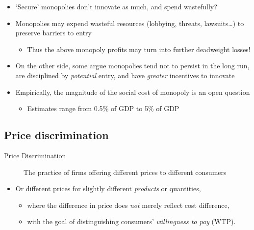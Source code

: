 \documentclass[]{article}
\providecommand{\tightlist}{%
  \setlength{\itemsep}{0pt}\setlength{\parskip}{0pt}}
\begin{document}
\begin{itemize}
\item
  `Secure' monopolies don't innovate as much, and spend wastefully?
\item
  Monopolies may expend wasteful resources (lobbying, threats,
  lawsuits\ldots) to preserve barriers to entry

  \begin{itemize}
  \tightlist
  \item
    Thus the above monopoly profits may turn into further deadweight
    losses!
  \end{itemize}
\item
  On the other side, some argue monopolies tend not to persist in the
  long run, are disciplined by \emph{potential} entry, and have
  \emph{greater} incentives to innovate
\item
  Empirically, the magnitude of the social cost of monopoly is an open
  question

  \begin{itemize}
  \tightlist
  \item
    Estimates range from 0.5\% of GDP to 5\% of GDP
  \end{itemize}
\end{itemize}

\hypertarget{price-discrimination}{%
\subsection{Price discrimination}\label{price-discrimination}}

\begin{description}
\item[Price Discrimination]
The practice of firms offering different prices to different consumers
\end{description}

\begin{itemize}
\tightlist
\item
  Or different prices for slightly different \emph{products} or
  quantities,

  \begin{itemize}
  \tightlist
  \item
    where the difference in price does \emph{not} merely reflect cost
    difference,
  \item
    with the goal of distinguishing consumers' \emph{willingness to pay}
    (WTP).
  \end{itemize}
\end{itemize}
\end{document}
